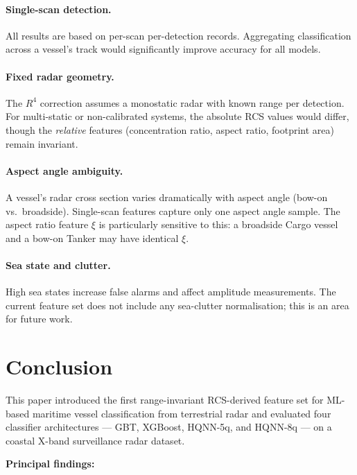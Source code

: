 \documentclass[journal]{IEEEtran}
\begin{document}
\paragraph{Single-scan detection.} All results are based on per-scan
per-detection records. Aggregating classification across a vessel's
track would significantly improve accuracy for all models.

\paragraph{Fixed radar geometry.} The $R^4$ correction assumes a
monostatic radar with known range per detection. For multi-static or
non-calibrated systems, the absolute RCS values would differ, though
the \emph{relative} features (concentration ratio, aspect ratio,
footprint area) remain invariant.

\paragraph{Aspect angle ambiguity.} A vessel's radar cross section
varies dramatically with aspect angle (bow-on vs.\ broadside).
Single-scan features capture only one aspect angle sample. The
aspect ratio feature $\xi$ is particularly sensitive to this: a broadside
Cargo vessel and a bow-on Tanker may have identical $\xi$.

\paragraph{Sea state and clutter.} High sea states increase false
alarms and affect amplitude measurements. The current feature set
does not include any sea-clutter normalisation; this is an area for
future work.

\section{Conclusion}
\label{sec:conclusion}

This paper introduced the first range-invariant RCS-derived feature set
for ML-based maritime vessel classification from terrestrial radar and
evaluated four classifier architectures — GBT, XGBoost, HQNN-5q, and
HQNN-8q — on a coastal X-band surveillance radar dataset.

\medskip
\noindent\textbf{Principal findings:}
\end{document}
